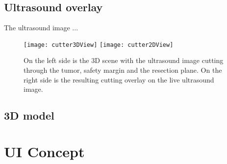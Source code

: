 \subsection{Ultrasound overlay}
The ultrasound image ...
\begin{figure}[H]
  \centering
  \texttt{[image: cutter3DView]} 
  \endminipage
  \hfill
  \texttt{[image: cutter2DView]}
  \endminipage
  \hfill 
 \caption{On the left side is the 3D scene with the ultrasound image cutting
   through the tumor, safety margin and the resection plane. On the right side
   is the resulting cutting overlay on the live ultrasound image.}
  \label{fig:cutterExample}
\end{figure}
\subsection{3D model}
\section{UI Concept}

